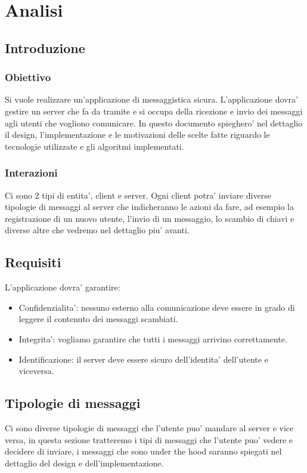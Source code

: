 \chapter{Analisi}

\section{Introduzione}

\subsection{Obiettivo}
Si vuole realizzare un’applicazione di messaggistica sicura. L’applicazione
dovra’ gestire un server che fa da tramite e si occupa della ricezione e invio dei messaggi agli
utenti che vogliono comunicare. In questo documento spieghero' nel dettaglio il design,
l'implementazione e le motivazioni delle scelte fatte riguardo le tecnologie utilizzate e gli
algoritmi implementati.

\subsection{Interazioni}
Ci sono 2 tipi di entita', client e server. Ogni client potra' inviare diverse tipologie di messaggi
al server che indicheranno le azioni da fare, ad esempio la registrazione di un nuovo utente,
l'invio di un messaggio, lo scambio di chiavi e diverse altre che vedremo nel dettaglio piu' avanti.

\section{Requisiti}
L'applicazione dovra' garantire:
\begin{itemize}
    \item Confidenzialita': nessuno esterno alla comunicazione deve essere in grado di leggere il
    contenuto dei messaggi scambiati.
    \item Integrita': vogliamo garantire che tutti i messaggi arrivino correttamente.
    \item Identificazione: il server deve essere sicuro dell'identita' dell'utente e viceversa.
\end{itemize}

\section{Tipologie di messaggi}
Ci sono diverse tipologie di messaggi che l'utente puo' mandare al server e vice versa, in questa
sezione tratteremo i tipi di messaggi che l'utente puo' vedere e decidere di inviare, i messaggi che
sono under the hood saranno spiegati nel dettaglio del design e dell'implementazione.

